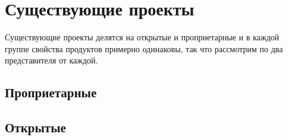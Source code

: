 \section{Существующие проекты}
Существующие проекты делятся на открытые и проприетарные и в каждой группе свойства продуктов примерно одинаковы, так что рассмотрим по два представителя от каждой.

    \subsection{Проприетарные}
        
        \pagebreak
        

    \pagebreak
    \subsection{Открытые}
        
        \pagebreak
        
